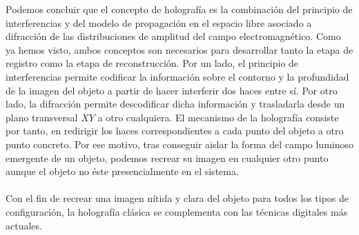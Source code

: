 \documentclass[12pt]{article}
\begin{document}
Podemos concluir que  el concepto de holografía es la combinación  del principio de interferencias y del modelo de propagación en el espacio libre asociado a difracción de las distribuciones de amplitud del campo electromagnético. Como ya hemos visto, ambos conceptos son necesarios para desarrollar tanto la etapa de registro como la etapa de reconstrucción. Por un lado, el principio de  interferencias permite codificar la información sobre el contorno y  la profundidad de la imagen del objeto a partir de hacer interferir dos haces entre sí. Por otro lado,  la difracción   permite  descodificar dicha información y trasladarla desde un plano transversal $XY$ a otro cualquiera. El mecanismo de la holografía consiste por tanto, en redirigir los haces correspondientes a cada punto del objeto a otro punto concreto. Por ese motivo, tras conseguir aislar la forma del campo luminoso emergente de un objeto, podemos recrear su imagen en cualquier otro punto aunque el objeto no éste presencialmente en el sistema. \\ \\
Con el fin de recrear una imagen nítida y clara del objeto para todos los tipos de configuración, la holografía clásica se complementa con las técnicas digitales más actuales.
\end{document}
